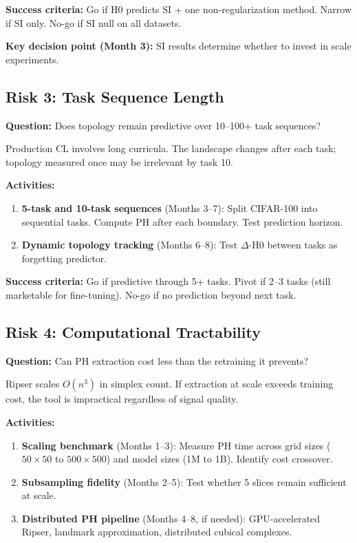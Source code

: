\documentclass[11pt,letterpaper]{article}
\begin{document}
\textbf{Success criteria:} Go if H0 predicts SI + one non-regularization method. Narrow if SI only. No-go if SI null on all datasets.

\textbf{Key decision point (Month 3):} SI results determine whether to invest in scale experiments.

\subsection{Risk 3: Task Sequence Length}

\textbf{Question:} Does topology remain predictive over 10--100+ task sequences?

Production CL involves long curricula. The landscape changes after each task; topology measured once may be irrelevant by task 10.

\textbf{Activities:}
\begin{enumerate}[nosep]
  \item \textbf{5-task and 10-task sequences} (Months 3--7): Split CIFAR-100 into sequential tasks. Compute PH after each boundary. Test prediction horizon.
  \item \textbf{Dynamic topology tracking} (Months 6--8): Test $\Delta$-H0 between tasks as forgetting predictor.
\end{enumerate}

\textbf{Success criteria:} Go if predictive through 5+ tasks. Pivot if 2--3 tasks (still marketable for fine-tuning). No-go if no prediction beyond next task.

\subsection{Risk 4: Computational Tractability}

\textbf{Question:} Can PH extraction cost less than the retraining it prevents?

Ripser scales $O(n^3)$ in simplex count. If extraction at scale exceeds training cost, the tool is impractical regardless of signal quality.

\textbf{Activities:}
\begin{enumerate}[nosep]
  \item \textbf{Scaling benchmark} (Months 1--3): Measure PH time across grid sizes ($50 \times 50$ to $500 \times 500$) and model sizes (1M to 1B). Identify cost crossover.
  \item \textbf{Subsampling fidelity} (Months 2--5): Test whether 5 slices remain sufficient at scale.
  \item \textbf{Distributed PH pipeline} (Months 4--8, if needed): GPU-accelerated Ripser, landmark approximation, distributed cubical complexes.
\end{enumerate}
\end{document}

